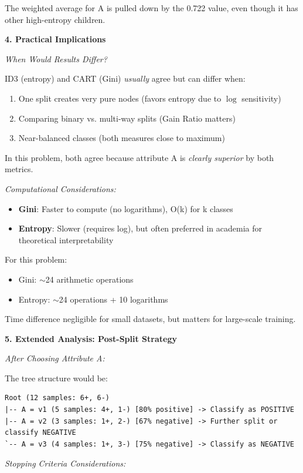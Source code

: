 \documentclass[12pt]{article}
\begin{document}
\begin{explanation}
The weighted average for A is pulled down by the 0.722 value, even though it has other high-entropy children.

\textbf{4. Practical Implications}

\textit{When Would Results Differ?}

ID3 (entropy) and CART (Gini) \textit{usually} agree but can differ when:
\begin{enumerate}
    \item One split creates very pure nodes (favors entropy due to $\log$ sensitivity)
    \item Comparing binary vs. multi-way splits (Gain Ratio matters)
    \item Near-balanced classes (both measures close to maximum)
\end{enumerate}

In this problem, both agree because attribute A is \textit{clearly superior} by both metrics.

\textit{Computational Considerations:}

\begin{itemize}
    \item \textbf{Gini}: Faster to compute (no logarithms), O(k) for k classes
    \item \textbf{Entropy}: Slower (requires log), but often preferred in academia for theoretical interpretability
\end{itemize}

For this problem:
\begin{itemize}
    \item Gini: $\sim$24 arithmetic operations
    \item Entropy: $\sim$24 operations + 10 logarithms
\end{itemize}

Time difference negligible for small datasets, but matters for large-scale training.

\textbf{5. Extended Analysis: Post-Split Strategy}

\textit{After Choosing Attribute A:}

The tree structure would be:
\begin{verbatim}
Root (12 samples: 6+, 6-)
|-- A = v1 (5 samples: 4+, 1-) [80% positive] -> Classify as POSITIVE
|-- A = v2 (3 samples: 1+, 2-) [67% negative] -> Further split or classify NEGATIVE
`-- A = v3 (4 samples: 1+, 3-) [75% negative] -> Classify as NEGATIVE
\end{verbatim}

\textit{Stopping Criteria Considerations:}


\end{explanation}
\end{document}
